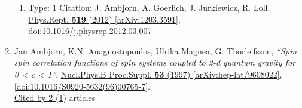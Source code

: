 \documentclass[a4paper,10pt]{article}
\begin{document}
\begin{enumerate}
\begin{enumerate}
  \item Type: 1 Citation: J. Ambjorn, A. Goerlich, J. Jurkiewicz, R. Loll, \href{https://www.doi.org/10.1016/j.physrep.2012.03.007}{Phys.Rept. {\bf 519} (2012) }  \href{https://arxiv.org/abs/1203.3591}{[arXiv:1203.3591]},\\\href{https://www.doi.org/10.1016/j.physrep.2012.03.007}{doi:10.1016/j.physrep.2012.03.007}
\end{enumerate}
\item Jan Ambjorn, K.N. Anagnostopoulos, Ulrika Magnea, G. Thorleifsson, {\it ``Spin spin correlation functions of spin systems coupled to 2-d quantum gravity for 0 < c < 1''}, \href{https://www.doi.org/10.1016/S0920-5632(96)00765-7}{Nucl.Phys.B Proc.Suppl. {\bf 53} (1997) } \href{https://arxiv.org/abs/hep-lat/9608022}{[arXiv:hep-lat/9608022]}, \href{https://www.doi.org/10.1016/S0920-5632(96)00765-7}{[doi:10.1016/S0920-5632(96)00765-7]}.
\\\href{https://inspirehep.net/literature/?q=refersto%3Arecid%3A421704}{Cited by 2 (1)} articles


\end{enumerate}
\end{document}

